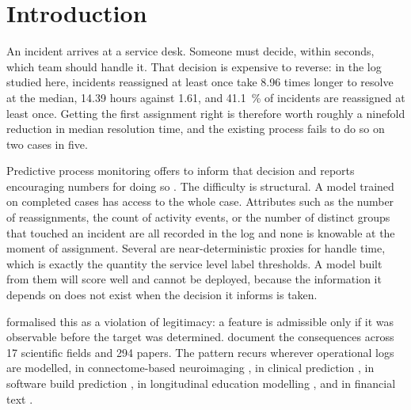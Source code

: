 
\section{Introduction}

An incident arrives at a service desk. Someone must decide, within seconds, which team
should handle it. That decision is expensive to reverse: in the log studied here, incidents
reassigned at least once take \num{8.96} times longer to resolve at the median, \num{14.39}
hours against \num{1.61}, and \SI{41.1}{\percent} of incidents are reassigned at least once.
Getting the first assignment right is therefore worth roughly a ninefold reduction in median
resolution time, and the existing process fails to do so on two cases in five.

Predictive process monitoring offers to inform that decision and reports encouraging numbers
for doing so \citep{teinemaa2019outcome,ceravolo2024predictive}. The difficulty is
structural. A model trained on completed cases has access to the whole case. Attributes such
as the number of reassignments, the count of activity events, or the number of distinct
groups that touched an incident are all recorded in the log and none is knowable at the
moment of assignment. Several are near-deterministic proxies for handle time, which is
exactly the quantity the service level label thresholds. A model built from them will score
well and cannot be deployed, because the information it depends on does not exist when the
decision it informs is taken.

\citet{kaufman2012leakage} formalised this as a violation of legitimacy: a feature is
admissible only if it was observable before the target was determined.
\citet{kapoor2023leakage} document the consequences across 17 scientific fields and 294
papers. The pattern recurs wherever operational logs are modelled, in connectome-based
neuroimaging \citep{rosenblatt2024leakage}, in clinical prediction
\citep{davis2024framework,ramadan2025diagnostic}, in software build prediction
\citep{mishra2026taxonomy}, in longitudinal education modelling
\citep{fauszt2026timeconsistent}, and in financial text \citep{xue2026temporal}.

